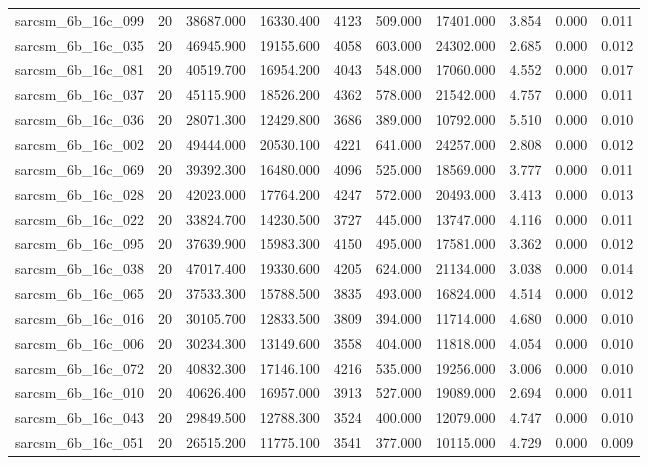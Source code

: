 \begin{tabular}{lrrrrrrrrr}
sarcsm\_6b\_16c\_099 & 20 & 38687.000 & 16330.400 & 4123 & 509.000 & 17401.000 & 3.854 & 0.000 & 0.011 \\
sarcsm\_6b\_16c\_035 & 20 & 46945.900 & 19155.600 & 4058 & 603.000 & 24302.000 & 2.685 & 0.000 & 0.012 \\
sarcsm\_6b\_16c\_081 & 20 & 40519.700 & 16954.200 & 4043 & 548.000 & 17060.000 & 4.552 & 0.000 & 0.017 \\
sarcsm\_6b\_16c\_037 & 20 & 45115.900 & 18526.200 & 4362 & 578.000 & 21542.000 & 4.757 & 0.000 & 0.011 \\
sarcsm\_6b\_16c\_036 & 20 & 28071.300 & 12429.800 & 3686 & 389.000 & 10792.000 & 5.510 & 0.000 & 0.010 \\
sarcsm\_6b\_16c\_002 & 20 & 49444.000 & 20530.100 & 4221 & 641.000 & 24257.000 & 2.808 & 0.000 & 0.012 \\
sarcsm\_6b\_16c\_069 & 20 & 39392.300 & 16480.000 & 4096 & 525.000 & 18569.000 & 3.777 & 0.000 & 0.011 \\
sarcsm\_6b\_16c\_028 & 20 & 42023.000 & 17764.200 & 4247 & 572.000 & 20493.000 & 3.413 & 0.000 & 0.013 \\
sarcsm\_6b\_16c\_022 & 20 & 33824.700 & 14230.500 & 3727 & 445.000 & 13747.000 & 4.116 & 0.000 & 0.011 \\
sarcsm\_6b\_16c\_095 & 20 & 37639.900 & 15983.300 & 4150 & 495.000 & 17581.000 & 3.362 & 0.000 & 0.012 \\
sarcsm\_6b\_16c\_038 & 20 & 47017.400 & 19330.600 & 4205 & 624.000 & 21134.000 & 3.038 & 0.000 & 0.014 \\
sarcsm\_6b\_16c\_065 & 20 & 37533.300 & 15788.500 & 3835 & 493.000 & 16824.000 & 4.514 & 0.000 & 0.012 \\
sarcsm\_6b\_16c\_016 & 20 & 30105.700 & 12833.500 & 3809 & 394.000 & 11714.000 & 4.680 & 0.000 & 0.010 \\
sarcsm\_6b\_16c\_006 & 20 & 30234.300 & 13149.600 & 3558 & 404.000 & 11818.000 & 4.054 & 0.000 & 0.010 \\
sarcsm\_6b\_16c\_072 & 20 & 40832.300 & 17146.100 & 4216 & 535.000 & 19256.000 & 3.006 & 0.000 & 0.010 \\
sarcsm\_6b\_16c\_010 & 20 & 40626.400 & 16957.000 & 3913 & 527.000 & 19089.000 & 2.694 & 0.000 & 0.011 \\
sarcsm\_6b\_16c\_043 & 20 & 29849.500 & 12788.300 & 3524 & 400.000 & 12079.000 & 4.747 & 0.000 & 0.010 \\
sarcsm\_6b\_16c\_051 & 20 & 26515.200 & 11775.100 & 3541 & 377.000 & 10115.000 & 4.729 & 0.000 & 0.009 \\

\end{tabular}
